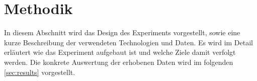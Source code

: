 \section{Methodik}
In diesem Abschnitt wird das Design des Experiments vorgestellt, sowie eine kurze Beschreibung der verwendeten Technologien und Daten.
Es wird im Detail erläutert wie das Experiment aufgebaut ist und welche Ziele damit verfolgt werden.
Die konkrete Auswertung der erhobenen Daten wird im folgenden \autoref{sec:results} vorgestellt.


